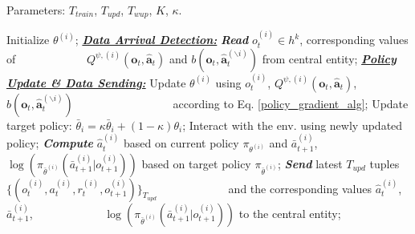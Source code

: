 \begin{algorithm}[t]
    \small
    \caption{\small\textit{Learning Procedures for Each Agent $i$}}
    \label{learning_alg_each_agent}
    Parameters: $T_{train}$, $T_{upd}$, $T_{wup}$, $K$, $\kappa$.
    \begin{algorithmic}[1]
        \State Initialize $\theta^{(i)}$;
            \vspace{6pt}
            \State \underline{\textbf{\textit{Data Arrival Detection:}}}
                \State \textbf{\textit{Read}} $o^{(i)}_t\in h^{k}$,
                corresponding values of
                \Statex ~~~~~~~~~~~~$Q^{\psi,(i)}(\mathbf{o}_t,\mathbf{\hat{a}}_t)$ and $b(\mathbf{o}_t,\mathbf{\hat{a}}^{(\backslash i)}_t)$ from central entity;
            \EndFor
            \vspace{6pt}
            \State \underline{\textbf{\textit{Policy Update \& Data Sending:}}}
                    \State Update $\theta^{(i)}$ using $o^{(i)}_t$, $Q^{\psi,(i)}(\mathbf{o}_t,\mathbf{\hat{a}}_t)$, $b(\mathbf{o}_t,\mathbf{\hat{a}}^{(\backslash i)}_t)$ 
                    \Statex ~~~~~~~~~~~~~~~~~according to Eq. \eqref{policy_gradient_alg};
                    \State Update target policy: $\bar{\theta}_i = \kappa\bar{\theta}_i + (1-\kappa)\theta_i$;
                \EndFor
                \vspace{4pt}
                \State Interact with the env. using newly updated policy;
                \vspace{4pt}
                \State \textbf{\textit{Compute}} $\hat{a}_t^{(i)}$ based on current policy $\pi_{\theta^{(i)}}$ and $\bar{a}_{t+1}^{(i)}$, \Statex ~~~~~~~~~~~~$\log(\pi_{\bar{\theta}^{(i)}}(\bar{a}_{t+1}^{(i)}|o_{t+1}^{(i)}))$ based on target policy $\pi_{\bar{\theta}^{(i)}}$;
                \State \textbf{\textit{Send}} latest $T_{upd}$ tuples
                  $\{(o^{(i)}_t,a^{(i)}_t,r^{(i)}_t,o_{t+1}^{(i)})\}_{T_{upd}}$
                  \Statex ~~~~~~~~~~~~and the corresponding values $\hat{a}_t^{(i)}$, $\bar{a}_{t+1}^{(i)}$, 
                  \Statex ~~~~~~~~~~~~$\log(\pi_{\bar{\theta}^{(i)}}(\bar{a}_{t+1}^{(i)}|o_{t+1}^{(i)}))$ to the central entity;
            \EndIf
        \EndFor
    \end{algorithmic}
\end{algorithm}

